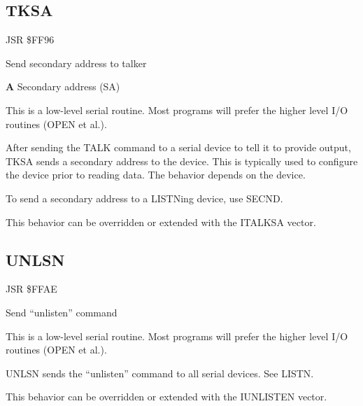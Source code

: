 \subsection{TKSA}
\label{KERNAL Jump Table!TKSA}
\begin{description}[leftmargin=2cm,style=nextline]
    \item [Address:] JSR \$FF96
    \item [Description:] Send secondary address to talker
    \item [Inputs:]
        \textbf{A} Secondary address (SA)
    \item [Remarks:]
        This is a low-level serial routine. Most programs will prefer the higher level I/O routines (OPEN et al.).

        After sending the TALK command to a serial device to tell it to provide output, TKSA sends a secondary address to the device. This is typically used to configure the device prior to reading data. The behavior depends on the device.

        To send a secondary address to a LISTNing device, use SECND.

        This behavior can be overridden or extended with the ITALKSA vector.
    \item [Example:]
\end{description}



\newpage
\subsection{UNLSN}
\label{KERNAL Jump Table!UNLSN}
\begin{description}[leftmargin=2cm,style=nextline]
    \item [Address:] JSR \$FFAE
    \item [Description:] Send ``unlisten'' command
    \item [Remarks:]
        This is a low-level serial routine. Most programs will prefer the higher level I/O routines (OPEN et al.).

        UNLSN sends the ``unlisten'' command to all serial devices. See LISTN.

        This behavior can be overridden or extended with the IUNLISTEN vector.
    \item [Example:]
\end{description}


